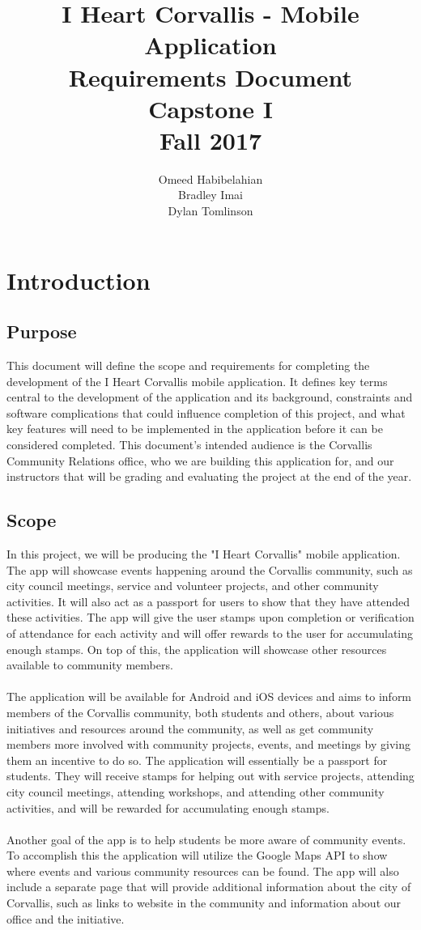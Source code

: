 \documentclass[draftclsnofoot, onecolumn, 10pt, compsoc]{IEEEtran}
\title{\textbf{I Heart Corvallis - Mobile Application\\Requirements Document}\\Capstone I\\Fall 2017}
\author{Omeed Habibelahian\\Bradley Imai\\Dylan Tomlinson}
\begin{document}
	\maketitle
	\newpage
	
	\section{Introduction}
		\subsection{Purpose}
			This document will define the scope and requirements for completing the development of the I Heart Corvallis mobile application. It defines key terms central to the development of the application and its background, constraints and software complications that could influence completion of this project, and what key features will need to be implemented in the application before it can be considered completed. This document's intended audience is the Corvallis Community Relations office, who we are building this application for, and our instructors that will be grading and evaluating the project at the end of the year.
			
		\subsection{Scope}
			In this project, we will be producing the "I Heart Corvallis" mobile application. The app will showcase events happening around the Corvallis community, such as city council meetings, service and volunteer projects, and other community activities. It will also act as a passport for users to show that they have attended these activities. The app will give the user stamps upon completion or verification of attendance for each activity and will offer rewards to the user for accumulating enough stamps. On top of this, the application will showcase other resources available to community members. \\ \\
			The application will be available for Android and iOS devices and aims to inform members of the Corvallis community, both students and others, about various initiatives and resources around the community, as well as get community members more involved with community projects, events, and meetings by giving them an incentive to do so.
The application will essentially be a passport for students. They will receive stamps for helping out with service projects, attending city council meetings, attending workshops, and attending other community activities, and will be rewarded for accumulating enough stamps. \\ \\
			Another goal of the app is to help students be more aware of community events.  To accomplish this  the application will utilize the Google Maps API to show where events and various community resources can be found. The app will also include a separate page that will provide additional information about the city of Corvallis, such as links to website in the community and information about our office and the initiative.
			
\end{document}
